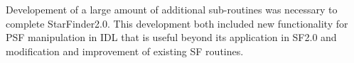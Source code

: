 Developement of a large amount of additional sub-routines was necessary to complete StarFinder2.0. This development both included new functionality for PSF manipulation in IDL that is useful beyond its application in SF2.0 and modification and improvement of existing SF routines.
  